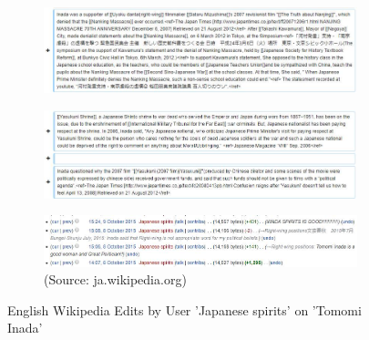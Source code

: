 \documentclass[10pt,british,A4paper,twoside]{memoir}
\begin{document}
\begin{figure}[!htb]
 \centering
 \begin{subfigure}[b]{0.9\textwidth}
 \includegraphics[width=\textwidth]{images/wiki/japanese-spirits-inada1.jpg}
 \end{subfigure}
 \begin{subfigure}[b]{0.9\textwidth}
 \includegraphics[width=\textwidth]{images/wiki/japanese-spirits-inada2.jpg}
 \end{subfigure}
 \begin{subfigure}[b]{0.9\textwidth}
 \includegraphics[width=\textwidth]{images/wiki/japanese-spirits-inada0.jpg}
 \caption*{(Source: ja.wikipedia.org)}
 \end{subfigure}
 \caption{English Wikipedia Edits by User 'Japanese spirits' on 'Tomomi Inada'}\label{fig:js-inada}
\end{figure}
\end{document}
